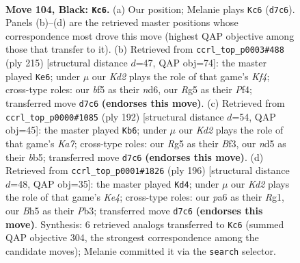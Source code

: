 \documentclass[11pt]{article}
\begin{document}
\clearpage

\begin{figure}[p]\centering
\begin{subfigure}{0.46\textwidth}\centering
\resizebox{\linewidth}{!}{%
\newchessgame
\chessboard[
  setfen={8/2Bk4/PP6/3N1Brb/8/1K5p/5R2/8 b - - 8 104},
  showmover=false,
  pgfstyle=straightmove, color=movearrow, markmove={d7-c6}
]}
\caption{}
\end{subfigure}\hfill
\begin{subfigure}{0.46\textwidth}\centering
\resizebox{\linewidth}{!}{%
\newchessgame
\chessboard[
  setfen={8/7p/3N4/5kB1/5p1P/3K1P2/7r/8 b - - 74 108},
  showmover=false,
  pgfstyle=straightmove, color=movearrow, markmove={f5-e6}
]}
\caption{}
\end{subfigure}
\\[4pt]
\begin{subfigure}{0.46\textwidth}\centering
\resizebox{\linewidth}{!}{%
\newchessgame
\chessboard[
  setfen={8/K2r2k1/p5p1/Pb2R1P1/8/5B2/8/8 w - - 48 97},
  showmover=false,
  pgfstyle=straightmove, color=movearrow, markmove={a7-b6}
]}
\caption{}
\end{subfigure}\hfill
\begin{subfigure}{0.46\textwidth}\centering
\resizebox{\linewidth}{!}{%
\newchessgame
\chessboard[
  setfen={8/5r2/3k4/3b4/1p2K3/1Pp5/2P5/1B4R1 w - - 4 99},
  showmover=false,
  pgfstyle=straightmove, color=movearrow, markmove={e4-d4}
]}
\caption{}
\end{subfigure}
\caption{\textbf{Move 104, Black: \texttt{Kc6}.} (a) Our position; Melanie plays \texttt{Kc6} (\texttt{d7c6}). Panels (b)--(d) are the retrieved master positions whose correspondence most drove this move (highest QAP objective among those that transfer to it). (b) Retrieved from \texttt{ccrl\_top\_p0003\#488} (ply 215) [structural distance $d$=47, QAP obj=74]: the master played \texttt{Ke6}; under $\mu$ our \emph{Kd2} plays the role of that game's \emph{Kf4}; cross-type roles: our \emph{b}f5 as their \emph{n}d6, our \emph{R}g5 as their \emph{P}f4; transferred move \texttt{d7c6} \textbf{(endorses this move)}. (c) Retrieved from \texttt{ccrl\_top\_p0000\#1085} (ply 192) [structural distance $d$=54, QAP obj=45]: the master played \texttt{Kb6}; under $\mu$ our \emph{Kd2} plays the role of that game's \emph{Ka7}; cross-type roles: our \emph{R}g5 as their \emph{B}f3, our \emph{n}d5 as their \emph{b}b5; transferred move \texttt{d7c6} \textbf{(endorses this move)}. (d) Retrieved from \texttt{ccrl\_top\_p0001\#1826} (ply 196) [structural distance $d$=48, QAP obj=35]: the master played \texttt{Kd4}; under $\mu$ our \emph{Kd2} plays the role of that game's \emph{Ke4}; cross-type roles: our \emph{p}a6 as their \emph{R}g1, our \emph{B}h5 as their \emph{P}b3; transferred move \texttt{d7c6} \textbf{(endorses this move)}. Synthesis: 6 retrieved analogs transferred to \texttt{Kc6} (summed QAP objective 304, the strongest correspondence among the candidate moves); Melanie committed it via the \texttt{search} selector.}
\label{fig:thought-m207}
\end{figure}
\end{document}
